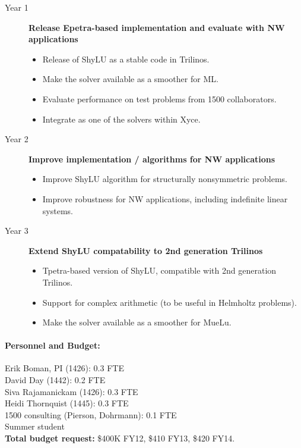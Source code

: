 \documentclass[10pt]{amsart}
\begin{document}
\begin{description}
\item[Year 1] {\bf Release Epetra-based implementation and evaluate with NW applications}
  \begin{itemize} 
  \item Release of ShyLU as a stable code in Trilinos.
  \item Make the solver available as a smoother for ML.
  \item Evaluate performance on test problems from 1500 collaborators.
  \item Integrate as one of the solvers within Xyce.
  \end{itemize}
\item[Year 2] {\bf Improve implementation / algorithms for NW applications}
  \begin{itemize}
  \item Improve ShyLU algorithm for structurally nonsymmetric problems.
  \item Improve robustness for NW applications, including indefinite linear systems.
  \end{itemize}
\item[Year 3] {\bf Extend ShyLU compatability to 2nd generation Trilinos}
  \begin{itemize}
  \item Tpetra-based version of ShyLU, compatible with 2nd generation Trilinos.
  \item Support for complex arithmetic (to be useful in Helmholtz problems).
  \item Make the solver available as a smoother for MueLu.
  \end{itemize}
\end{description}


\paragraph{\bf Personnel and Budget:}
Erik Boman, PI (1426): 0.3 FTE\\
David Day (1442): 0.2 FTE\\
Siva Rajamanickam (1426): 0.3 FTE\\
Heidi Thornquist (1445): 0.3 FTE\\
1500 consulting (Pierson, Dohrmann): 0.1 FTE\\
Summer student\\
%
\textbf{Total budget request:} \$400K FY12, \$410 FY13, \$420 FY14.
\end{document}
